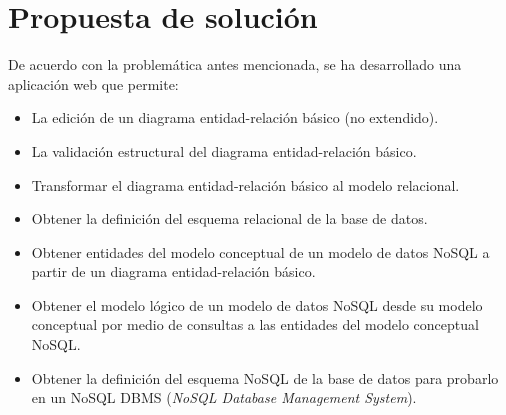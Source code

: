 \section{Propuesta de solución}

De acuerdo con la problemática antes mencionada, se ha desarrollado una aplicación web que permite:

\begin{itemize}
    \item La edición de un diagrama entidad-relación básico (no extendido).
    \item La validación estructural del diagrama entidad-relación básico.
    \item Transformar el diagrama entidad-relación básico al modelo relacional.
    \item Obtener la definición del esquema relacional de la base de datos.
    \item Obtener entidades del modelo conceptual de un modelo de datos NoSQL a partir de un diagrama entidad-relación básico.
    \item Obtener el modelo lógico de un modelo de datos NoSQL desde su modelo conceptual por medio de consultas a las entidades del modelo conceptual NoSQL.
    \item Obtener la definición del esquema NoSQL de la base de datos para probarlo en un NoSQL DBMS (\textit{NoSQL Database Management System}).
\end{itemize}